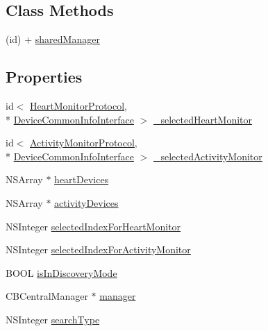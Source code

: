 \subsection*{Class Methods}
\begin{DoxyCompactItemize}
\item 
(id) + \hyperlink{interface_b_t_device_manager_a38ff364ec62dc4ab4aea65f2aebed98c}{shared\-Manager}
\end{DoxyCompactItemize}
\subsection*{Properties}
\begin{DoxyCompactItemize}
\item 
id$<$ \hyperlink{protocol_heart_monitor_protocol-p}{Heart\-Monitor\-Protocol}, \\*
\hyperlink{protocol_device_common_info_interface-p}{Device\-Common\-Info\-Interface} $>$ \hyperlink{interface_b_t_device_manager_ab303b2617a6391db56c3b61f217f9b6b}{\-\_\-selected\-Heart\-Monitor}
\item 
id$<$ \hyperlink{protocol_activity_monitor_protocol-p}{Activity\-Monitor\-Protocol}, \\*
\hyperlink{protocol_device_common_info_interface-p}{Device\-Common\-Info\-Interface} $>$ \hyperlink{interface_b_t_device_manager_a53a05cc87797350638a2b82c337eb854}{\-\_\-selected\-Activity\-Monitor}
\item 
N\-S\-Array $\ast$ \hyperlink{interface_b_t_device_manager_a76ffd5887aa2d8c8ea20df2384851d41}{heart\-Devices}
\item 
N\-S\-Array $\ast$ \hyperlink{interface_b_t_device_manager_a8f6f577bb25b7dcd8b3857d6497bff4e}{activity\-Devices}
\item 
N\-S\-Integer \hyperlink{interface_b_t_device_manager_a98add70110c91e4266481e312d96afbf}{selected\-Index\-For\-Heart\-Monitor}
\item 
N\-S\-Integer \hyperlink{interface_b_t_device_manager_a8e47d59f0a40f8d96f4fea826be853d1}{selected\-Index\-For\-Activity\-Monitor}
\item 
B\-O\-O\-L \hyperlink{interface_b_t_device_manager_a15cc71749368c5de76624c5c4e4f7b3c}{is\-In\-Discovery\-Mode}
\item 
C\-B\-Central\-Manager $\ast$ \hyperlink{interface_b_t_device_manager_a61d03c41c000f28ce50e88bd9b8f6be9}{manager}
\item 
N\-S\-Integer \hyperlink{interface_b_t_device_manager_a610db66209e9d142e5451ceedc3c6a36}{search\-Type}
\item 

\end{DoxyCompactItemize}
